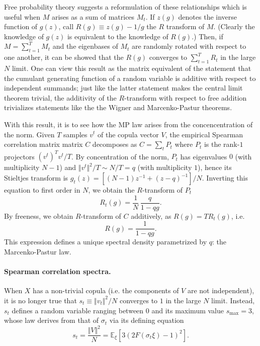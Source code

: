 \documentclass[
 prl,
 twocolumn,
 amsmath,
 amssymb,
 aps,
]{revtex4-2}
\begin{document}
Free probability theory suggests a reformulation of these relationships which is useful when $M$ arises as a sum of matrices $M_t$. 
If $z(g)$ denotes the inverse function of $g(z)$, call $R(g) \equiv z(g) - 1/g$ the $R$ transform of $M$. (Clearly the knowledge of $g(z)$ is equivalent to the knowledge of $R(g)$.)
Then, if $M = \sum_{t = 1}^T M_t$ and the eigenbases of $M_t$ are randomly rotated with respect to one another, it can be showed that the $R(g)$ converges to $\sum_{t = 1}^T R_t$ in the large $N$ limit. 
One can view this result as the matrix equivalent of the statement that the cumulant generating function of a random variable is additive with respect to independent summands; just like the latter statement makes the central limit theorem trivial, the additivity of the $R$-transform with respect to free addition trivializes statements like the the Wigner and Marcenko-Pastur theorems. 

With this result, it is to see how the MP law arises from the concencentration of the norm. 
Given $T$ samples $v^t$ of the copula vector $V$, the empirical Spearman correlation matrix matrix $C$ decomposes as $C = \sum_t P_t$ where $P_t$ is the rank-$1$ projectors $(v^t)^T v^t / T$. 
By concentration of the norm, $P_t$ has eigenvalues $0$ (with multiplicity $N-1$) and $\Vert v^t\Vert ^2 / T \sim N/T = q$ (with multiplicity $1$), hence its Stieltjes transform is $g_t(z) = [(N-1)z^{-1} + (z - q)^{-1}]/N$. 
Inverting this equation to first order in $N$, we obtain the $R$-transform of $P_t$
\begin{equation}
    R_t(g) = \frac{1}{N}\, \frac{q}{1-qg}.
\end{equation}
By freeness, we obtain $R$-transform of $C$ additively, as $R(g) = T R_t(g)$, i.e.
\begin{equation}
    R(g) = \frac{1}{1-qg}.
\end{equation}
This expression defines a unique spectral density parametrized by $q$: the Marcenko-Pastur law. 

\paragraph*{Spearman correlation spectra.}
When $X$ has a non-trivial copula (i.e. the components of $V$ are not independent), it is no longer true that $s_t \equiv \Vert v_t\Vert ^2 / N$ converges to $1$ in the large $N$ limit.
Instead, $s_t$ defines a random variable ranging between $0$ and its maximum value $s_\textrm{max} = 3$, whose law derives from that of $\sigma_t$ via its defining equation
\begin{equation}
    s_t = \frac{\Vert V\Vert^2}{N} = \mathbb{E}_\xi [3(2F(\sigma_t \xi) - 1)^2].
\end{equation}
\end{document}

